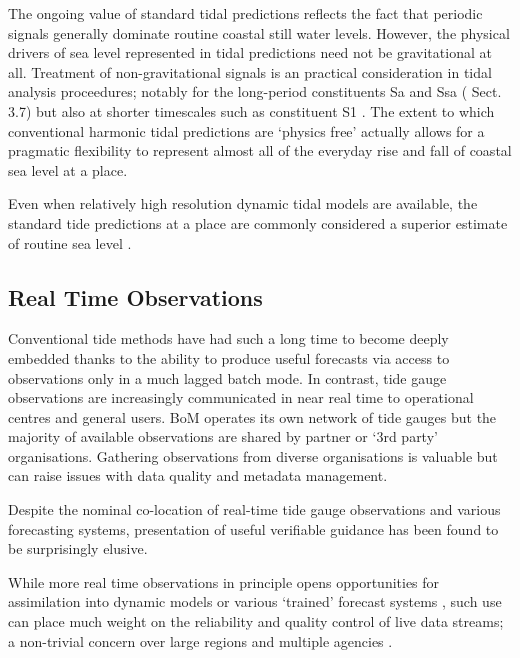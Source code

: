 The ongoing value of standard tidal predictions reflects the fact that periodic signals generally dominate routine coastal still water levels.
However, the physical drivers of sea level represented in tidal predictions need not be gravitational at all.
Treatment of non-gravitational signals is an practical consideration in tidal analysis proceedures; notably for the long-period constituents Sa and Ssa (\cite[]{Parker:2007wq} Sect. 3.7) but also at shorter timescales such as constituent S1 \cite{Ray:2004ts}.
The extent to which conventional harmonic tidal predictions are `physics free' actually allows for a pragmatic flexibility to represent almost all of the everyday rise and fall of coastal sea level at a place.

Even when relatively high resolution dynamic tidal models are available, the standard tide predictions at a place are commonly considered a superior estimate of routine sea level \cite{Horsburgh:2008gw,Egbert:1996vr}.


\subsection{Real Time Observations}
Conventional tide methods have had such a long time to become deeply embedded \cite{Cartwright:2000tt} thanks to the ability to produce useful forecasts via access to observations only in a much lagged batch mode.  
In contrast, tide gauge observations are increasingly communicated in near real time to operational centres and general users. 
BoM operates its own network of tide gauges \cite{Greenslade:2012um} but the majority of available observations are shared by partner or `3rd party' organisations. 
Gathering observations from diverse organisations is valuable but can raise issues with data quality and metadata management.

Despite the nominal co-location of real-time tide gauge observations and various forecasting systems, presentation of useful verifiable guidance has been found to be surprisingly elusive.     

While more real time observations in principle opens opportunities for assimilation into dynamic models or various `trained' forecast systems \cite{Horsburgh:2011th}, such use can place much weight on the reliability and quality control of live data streams; a non-trivial concern over large regions and multiple agencies \cite{Mourre:2006hz}.


